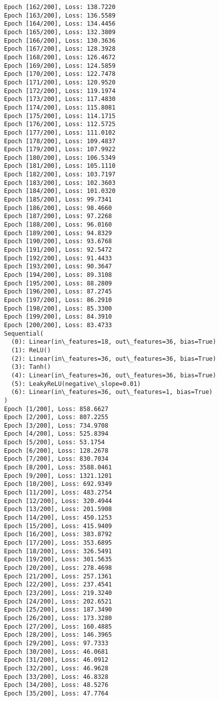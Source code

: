 \documentclass[11pt]{article}
\begin{document}
\begin{Verbatim}[commandchars=\\\{\}]
Epoch [162/200], Loss: 138.7220
Epoch [163/200], Loss: 136.5589
Epoch [164/200], Loss: 134.4456
Epoch [165/200], Loss: 132.3809
Epoch [166/200], Loss: 130.3636
Epoch [167/200], Loss: 128.3928
Epoch [168/200], Loss: 126.4672
Epoch [169/200], Loss: 124.5859
Epoch [170/200], Loss: 122.7478
Epoch [171/200], Loss: 120.9520
Epoch [172/200], Loss: 119.1974
Epoch [173/200], Loss: 117.4830
Epoch [174/200], Loss: 115.8081
Epoch [175/200], Loss: 114.1715
Epoch [176/200], Loss: 112.5725
Epoch [177/200], Loss: 111.0102
Epoch [178/200], Loss: 109.4837
Epoch [179/200], Loss: 107.9922
Epoch [180/200], Loss: 106.5349
Epoch [181/200], Loss: 105.1110
Epoch [182/200], Loss: 103.7197
Epoch [183/200], Loss: 102.3603
Epoch [184/200], Loss: 101.0320
Epoch [185/200], Loss: 99.7341
Epoch [186/200], Loss: 98.4660
Epoch [187/200], Loss: 97.2268
Epoch [188/200], Loss: 96.0160
Epoch [189/200], Loss: 94.8329
Epoch [190/200], Loss: 93.6768
Epoch [191/200], Loss: 92.5472
Epoch [192/200], Loss: 91.4433
Epoch [193/200], Loss: 90.3647
Epoch [194/200], Loss: 89.3108
Epoch [195/200], Loss: 88.2809
Epoch [196/200], Loss: 87.2745
Epoch [197/200], Loss: 86.2910
Epoch [198/200], Loss: 85.3300
Epoch [199/200], Loss: 84.3910
Epoch [200/200], Loss: 83.4733
Sequential(
  (0): Linear(in\_features=18, out\_features=36, bias=True)
  (1): ReLU()
  (2): Linear(in\_features=36, out\_features=36, bias=True)
  (3): Tanh()
  (4): Linear(in\_features=36, out\_features=36, bias=True)
  (5): LeakyReLU(negative\_slope=0.01)
  (6): Linear(in\_features=36, out\_features=1, bias=True)
)
Epoch [1/200], Loss: 858.6627
Epoch [2/200], Loss: 807.2255
Epoch [3/200], Loss: 734.9708
Epoch [4/200], Loss: 525.8394
Epoch [5/200], Loss: 53.1754
Epoch [6/200], Loss: 128.2678
Epoch [7/200], Loss: 830.7034
Epoch [8/200], Loss: 3588.0461
Epoch [9/200], Loss: 1321.1201
Epoch [10/200], Loss: 692.9349
Epoch [11/200], Loss: 483.2754
Epoch [12/200], Loss: 320.4944
Epoch [13/200], Loss: 201.5908
Epoch [14/200], Loss: 450.1253
Epoch [15/200], Loss: 415.9409
Epoch [16/200], Loss: 383.8792
Epoch [17/200], Loss: 353.6895
Epoch [18/200], Loss: 326.5491
Epoch [19/200], Loss: 301.5635
Epoch [20/200], Loss: 278.4698
Epoch [21/200], Loss: 257.1361
Epoch [22/200], Loss: 237.4541
Epoch [23/200], Loss: 219.3240
Epoch [24/200], Loss: 202.6521
Epoch [25/200], Loss: 187.3490
Epoch [26/200], Loss: 173.3280
Epoch [27/200], Loss: 160.4885
Epoch [28/200], Loss: 146.3965
Epoch [29/200], Loss: 97.7333
Epoch [30/200], Loss: 46.0681
Epoch [31/200], Loss: 46.0912
Epoch [32/200], Loss: 46.9628
Epoch [33/200], Loss: 46.8328
Epoch [34/200], Loss: 48.5276
Epoch [35/200], Loss: 47.7764

\end{Verbatim}
\end{document}
